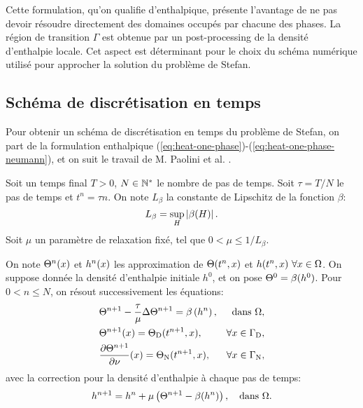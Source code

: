 Cette formulation, qu'on qualifie d'enthalpique, présente l'avantage
de ne pas devoir résoudre directement des domaines occupés par chacune
des phases. La région de transition $\Gamma$ est obtenue par un
post-processing de la densité d'enthalpie locale. Cet aspect est
déterminant pour le choix du schéma numérique utilisé pour approcher
la solution du problème de Stefan.

\subsection*{Schéma de discrétisation en temps}
Pour obtenir un schéma de discrétisation en temps du problème de
Stefan, on part de la formulation enthalpique
(\ref{eq:heat-one-phase})-(\ref{eq:heat-one-phase-neumann}), et on
suit le travail de M. Paolini et al. \cite{Paolini1988}.

Soit un temps final $T > 0$, $N\in \mathbb {\mathbb N^*}$ le nombre de pas de
temps. Soit $\tau = T / N$ le pas de temps et $t^n = \tau n$. On note
$L_\beta$ la constante de Lipschitz de la fonction $\beta$:
\begin{equation}
  L_\beta = \sup_{H}\left\lvert \beta(H) \right\rvert.
\end{equation}
Soit $\mu$ un paramètre de relaxation fixé, tel que $0 < \mu \leq
1/L_\beta$.

On note $\Theta^n(x)$ et $h^n(x)$ les approximation
de $\Theta(t^n, x)$ et $h(t^n, x)\ \forall x\in
\Omega$.  On suppose donnée la densité d'enthalpie initiale $h^0$, et
on pose $\Theta^0 = \beta(h^0)$. Pour $0 < n \leq N$, on résout
successivement les équations:
\begin{align}
  &\temperature^{n+1} - \frac{\tau}{\mu} \Delta \temperature^{n+1} = %
  \beta\parent{\enthalpydensity^n}, & \text{dans } \Omega,\label{eq:chernoff-heat}\\
  &\temperature^{n+1}(x) = \temperature_{\mathrm D}(t^{n+1}, x), &
  \forall x\in%
  \Gamma_\mathrm{D},\label{eq:chernoff-dirichlet}\\
  &\frac{\partial\temperature^{n+1}}{\partial \nu}(x) = %
  \temperature_\mathrm{N}(t^{n+1}, x), %
  & \forall x \in \Gamma_\mathrm{N},\label{eq:chernoff-neumann}
\end{align}
avec la correction pour la densité d'enthalpie à chaque pas de temps:
\begin{equation}\label{eq:chernoff-update}
h^{n+1} = h^{n} +
\mu\left( \Theta^{n+1} - \beta(h^{n}) \right), \quad
\text{dans } \Omega.
\end{equation}

